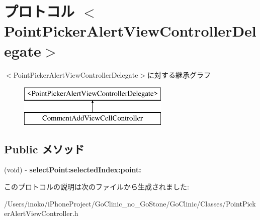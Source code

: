 \hypertarget{protocol_point_picker_alert_view_controller_delegate-p}{
\section{プロトコル $<$PointPickerAlertViewControllerDelegate$>$}
\label{protocol_point_picker_alert_view_controller_delegate-p}
}
$<$PointPickerAlertViewControllerDelegate$>$に対する継承グラフ\begin{figure}[H]
\begin{center}
\leavevmode
\includegraphics[height=2.000000cm]{protocol_point_picker_alert_view_controller_delegate-p}
\end{center}
\end{figure}
\subsection*{Public メソッド}
\begin{DoxyCompactItemize}
\item 
\hypertarget{protocol_point_picker_alert_view_controller_delegate-p_a31174937db68f5246ffcb4abe4d4173a}{
(void) -\/ {\bfseries selectPoint:selectedIndex:point:}}
\label{protocol_point_picker_alert_view_controller_delegate-p_a31174937db68f5246ffcb4abe4d4173a}

\end{DoxyCompactItemize}


このプロトコルの説明は次のファイルから生成されました:\begin{DoxyCompactItemize}
\item 
/Users/inoko/iPhoneProject/GoClinic\_\-no\_\-GoStone/GoClinic/Classes/PointPickerAlertViewController.h\end{DoxyCompactItemize}
